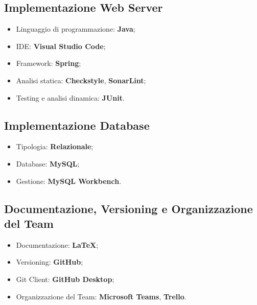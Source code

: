 \subsection*{Implementazione Web Server}
\begin{itemize}
    \item Linguaggio di programmazione: \textbf{Java};
    \item IDE: \textbf{Visual Studio Code};
    \item Framework: \textbf{Spring};
    \item Analisi statica: \textbf{Checkstyle}, \textbf{SonarLint};
    \item Testing e analisi dinamica: \textbf{JUnit}.
\end{itemize}

\subsection*{Implementazione Database}
\begin{itemize}
    \item Tipologia: \textbf{Relazionale};
    \item Database: \textbf{MySQL};
    \item Gestione: \textbf{MySQL Workbench}.
\end{itemize}

\subsection*{Documentazione, Versioning e Organizzazione del Team}
\begin{itemize}
    \item Documentazione: \textbf{LaTeX};
    \item Versioning: \textbf{GitHub};
    \item Git Client: \textbf{GitHub Desktop};
    \item Organizzazione del Team: \textbf{Microsoft Teams}, \textbf{Trello}.
\end{itemize}
    